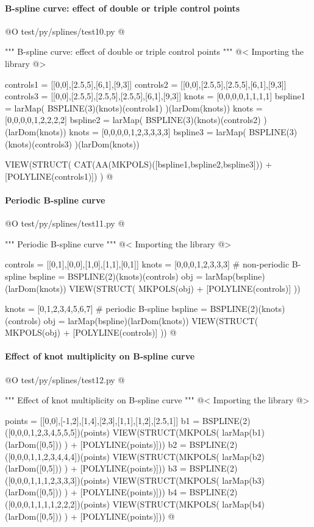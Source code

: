 \documentclass[11pt,oneside]{article}	%
\begin{document}
\paragraph{B-spline curve: effect of double or triple control points}


@O test/py/splines/test10.py
@{""" B-spline curve: effect of double or triple control points """
@< Importing the library @>

controls1 = [[0,0],[2.5,5],[6,1],[9,3]]
controls2 = [[0,0],[2.5,5],[2.5,5],[6,1],[9,3]]
controls3 = [[0,0],[2.5,5],[2.5,5],[2.5,5],[6,1],[9,3]]
knots = [0,0,0,0,1,1,1,1]
bspline1 = larMap( BSPLINE(3)(knots)(controls1) )(larDom(knots))
knots = [0,0,0,0,1,2,2,2,2]
bspline2 = larMap( BSPLINE(3)(knots)(controls2) )(larDom(knots))
knots = [0,0,0,0,1,2,3,3,3,3]
bspline3 = larMap( BSPLINE(3)(knots)(controls3) )(larDom(knots))

VIEW(STRUCT( CAT(AA(MKPOLS)([bspline1,bspline2,bspline3])) + 
	[POLYLINE(controls1)]) )
@}


\paragraph{Periodic B-spline curve}

@O test/py/splines/test11.py
@{""" Periodic B-spline curve """
@< Importing the library @>

controls = [[0,1],[0,0],[1,0],[1,1],[0,1]]
knots = [0,0,0,1,2,3,3,3]				# non-periodic B-spline
bspline = BSPLINE(2)(knots)(controls)
obj = larMap(bspline)(larDom(knots))  
VIEW(STRUCT( MKPOLS(obj) + [POLYLINE(controls)] ))

knots = [0,1,2,3,4,5,6,7]				# periodic B-spline
bspline = BSPLINE(2)(knots)(controls) 	
obj = larMap(bspline)(larDom(knots))
VIEW(STRUCT( MKPOLS(obj) + [POLYLINE(controls)] ))
@}

\paragraph{Effect of knot multiplicity on B-spline curve}


@O test/py/splines/test12.py
@{""" Effect of knot multiplicity on B-spline curve """
@< Importing the library @>

points = [[0,0],[-1,2],[1,4],[2,3],[1,1],[1,2],[2.5,1]]
b1 = BSPLINE(2)([0,0,0,1,2,3,4,5,5,5])(points)
VIEW(STRUCT(MKPOLS( larMap(b1)(larDom([0,5])) ) + [POLYLINE(points)]))
b2 = BSPLINE(2)([0,0,0,1,1,2,3,4,4,4])(points)
VIEW(STRUCT(MKPOLS( larMap(b2)(larDom([0,5])) ) + [POLYLINE(points)]))
b3 = BSPLINE(2)([0,0,0,1,1,1,2,3,3,3])(points)
VIEW(STRUCT(MKPOLS( larMap(b3)(larDom([0,5])) ) + [POLYLINE(points)]))
b4 = BSPLINE(2)([0,0,0,1,1,1,1,2,2,2])(points)
VIEW(STRUCT(MKPOLS( larMap(b4)(larDom([0,5])) ) + [POLYLINE(points)]))
@}
\end{document}
